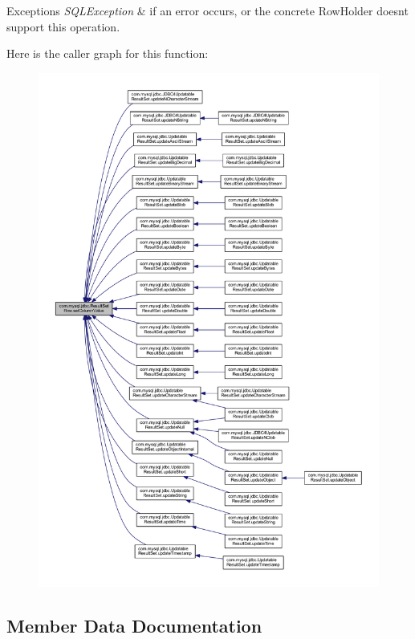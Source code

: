 \begin{DoxyExceptions}{Exceptions}
{\em S\+Q\+L\+Exception} & if an error occurs, or the concrete Row\+Holder doesn\textquotesingle{}t support this operation. \\
\hline
\end{DoxyExceptions}
Here is the caller graph for this function\+:
\nopagebreak
\begin{figure}[H]
\begin{center}
\leavevmode
\includegraphics[width=350pt]{classcom_1_1mysql_1_1jdbc_1_1_result_set_row_a39c9cab871e6878715135801daa3b09d_icgraph}
\end{center}
\end{figure}


\subsection{Member Data Documentation}
\mbox{\label{classcom_1_1mysql_1_1jdbc_1_1_result_set_row_ac63878ed59cf731b0f02ae12e80e27c0}} 

